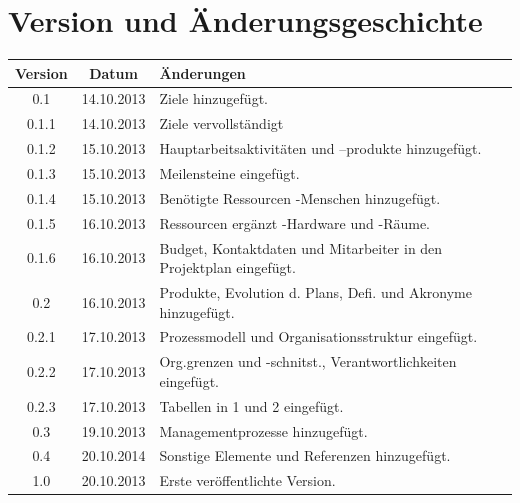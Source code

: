 \documentclass[fontsize=12pt,paper=a4,twoside]{scrartcl}
\begin{document}

\newpage

  \thispagestyle{fancy}
  \fancyhead{}
  \fancyfoot{}
  \renewcommand{\headrulewidth}{0.4pt}
  \tableofcontents
  \listoffigures %
  \listoftables %

\newpage



\section*{Version und Änderungsgeschichte}



\begin{tabular}{ccl}
Version & Datum & Änderungen \\
\hline
0.1 & 14.10.2013 & Ziele hinzugefügt.\\
0.1.1 & 14.10.2013 & Ziele vervollständigt\\
0.1.2 & 15.10.2013 & Hauptarbeitsaktivitäten und --produkte hinzugefügt.\\
0.1.3 & 15.10.2013 & Meilensteine eingefügt.\\
0.1.4 & 15.10.2013 & Benötigte Ressourcen -Menschen hinzugefügt.\\
0.1.5 & 16.10.2013 & Ressourcen ergänzt -Hardware und -Räume.\\
0.1.6 & 16.10.2013 & Budget, Kontaktdaten und Mitarbeiter in den Projektplan eingefügt.\\
0.2 & 16.10.2013 &  Produkte, Evolution d. Plans, Defi. und Akronyme hinzugefügt.\\
0.2.1 & 17.10.2013 & Prozessmodell und Organisationsstruktur eingefügt.\\
0.2.2 & 17.10.2013 & Org.grenzen und -schnitst., Verantwortlichkeiten eingefügt.\\
0.2.3 & 17.10.2013 & Tabellen in 1 und 2 eingefügt.\\
0.3 & 19.10.2013 & Managementprozesse hinzugefügt.\\
0.4 & 20.10.2014 & Sonstige Elemente und Referenzen hinzugefügt.\\
1.0 & 20.10.2013 & Erste veröffentlichte Version. \\
\end{tabular}
\end{document}
